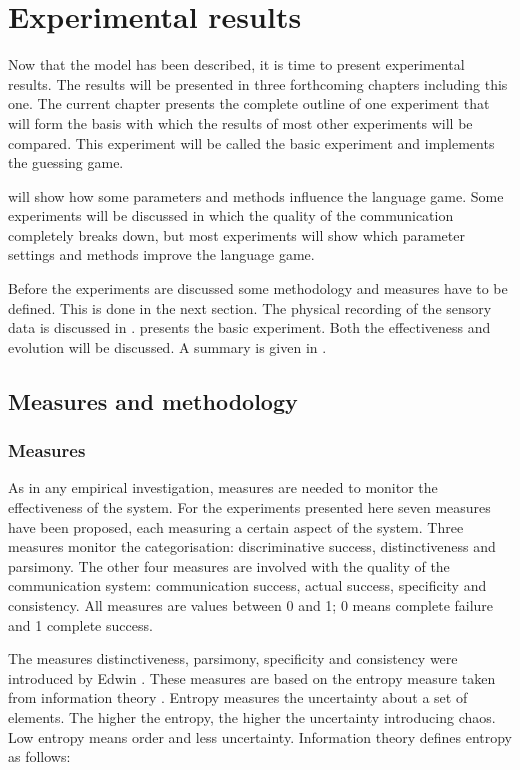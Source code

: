 \chapter{Experimental results}\label{ch:basic}

Now that the model has been described, it is time to present
experimental results. The results will be presented in three
forthcoming chapters including this one. The current chapter presents the complete outline of one experiment that will form the basis with which
the results of most other experiments will be compared. This experiment will be called the basic experiment and implements the guessing game.

 will show how some parameters and methods
influence the language game. Some experiments will be discussed
in which the quality of the communication completely breaks
down, but most experiments will show which parameter settings
and methods improve the language game.

Before the experiments are discussed some methodology and measures have
to be defined. This is done in the next section. The physical
recording of the sensory data is discussed in .  presents the
basic experiment. Both the effectiveness and evolution will be
discussed. A summary is given in .

\section{Measures and methodology}\label{s:st:measures}
\subsection{Measures}

As in any empirical investigation, measures are needed to
monitor the effectiveness of the system. For the experiments
presented here seven measures have been proposed, each measuring
a certain aspect of the system. Three measures monitor the categorisation: {\sc discriminative success}, {\sc
distinctiveness} and {\sc parsimony}. The other four measures
are involved with the quality of the communication system: {\sc
communication success}, {\sc actual success}, {\sc
specificity} and {\sc consistency}. All measures are values between 0 and 1; 0 means complete failure and 1 complete success.

The measures distinctiveness, parsimony, specificity and consistency were introduced by Edwin \citet{dejong:2000}. These measures are based on the entropy measure taken from information theory \citep{shannon:1948}. Entropy measures the uncertainty about a set of elements. The higher the entropy, the higher the uncertainty introducing chaos. Low entropy means order and less uncertainty. Information theory defines entropy as follows:

